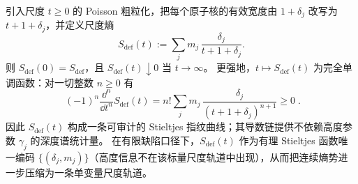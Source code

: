 \begin{proposition}
引入尺度 \(t\ge0\) 的 Poisson 粗粒化，把每个原子核的有效宽度由 \(1+\delta_j\) 改写为 \(t+1+\delta_j\)，并定义尺度熵
\[
S_{\mathrm{def}}(t):=\sum_{j}m_j\,\frac{\delta_j}{t+1+\delta_j}.
\]
则 \(S_{\mathrm{def}}(0)=S_{\mathrm{def}}\)，且 \(S_{\mathrm{def}}(t)\downarrow 0\) 当 \(t\to\infty\)。
更强地，\(t\mapsto S_{\mathrm{def}}(t)\) 为完全单调函数：对一切整数 \(n\ge0\) 有
\[
\boxed{\;
(-1)^n\frac{\dd^n}{\dd t^n}S_{\mathrm{def}}(t)
=n!\sum_{j}m_j\,\frac{\delta_j}{(t+1+\delta_j)^{n+1}}\ge0\; }.
\]
因此 \(S_{\mathrm{def}}(t)\) 构成一条可审计的 Stieltjes 指纹曲线；其导数链提供不依赖高度参数 \(\gamma_j\) 的深度谱统计量。
在有限缺陷口径下，\(S_{\mathrm{def}}(t)\) 作为有理 Stieltjes 函数唯一编码 \(\{(\delta_j,m_j)\}\)（高度信息不在该标量尺度轨道中出现），从而把连续熵势进一步压缩为一条单变量尺度轨道。
\end{proposition}



\endinput
